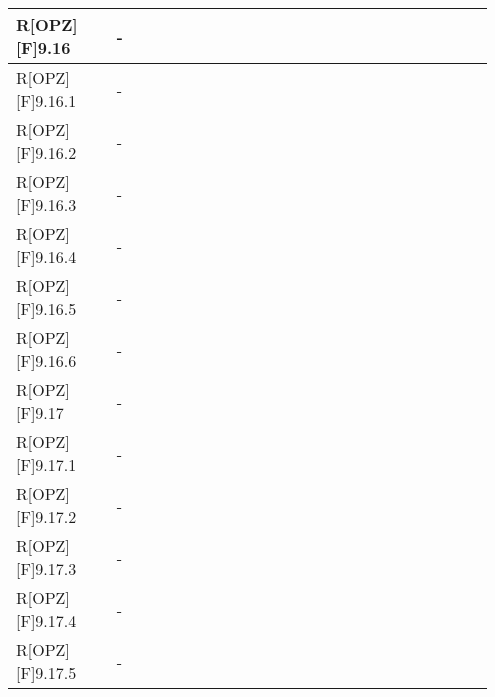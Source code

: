 \begin{table}[h]
\begin{center}
\begin{tabular}{|p{0.2\linewidth}|p{0.75\linewidth}|}
		\midrule
			R[OPZ][F]9.16 & -\\
		\midrule
			R[OPZ][F]9.16.1 & -\\
		\midrule
			R[OPZ][F]9.16.2 & -\\
		\midrule
			R[OPZ][F]9.16.3 & -\\
		\midrule
			R[OPZ][F]9.16.4 & -\\
		\midrule
			R[OPZ][F]9.16.5 & -\\
		\midrule
			R[OPZ][F]9.16.6 & -\\
		\midrule
			R[OPZ][F]9.17 & -\\
		\midrule
			R[OPZ][F]9.17.1 & -\\
		\midrule
			R[OPZ][F]9.17.2 & -\\
		\midrule
			R[OPZ][F]9.17.3 & -\\
		\midrule
			R[OPZ][F]9.17.4 & -\\
		\midrule
			R[OPZ][F]9.17.5 & -\\
		\bottomrule
		\end{tabular}
	\end{center}
\end{table}

